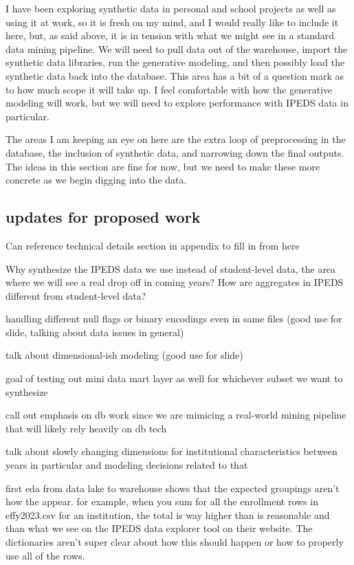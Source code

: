 \documentclass[sigconf, authorversion, nonacm]{acmart}
\begin{document}
    I have been exploring synthetic data in personal and school projects as well as using it at work, so it is fresh on my mind, and I would really like to include it here, but, as said above, it is in tension with what we might see in a standard data mining pipeline. We will need to pull data out of the warehouse, import the synthetic data libraries, run the generative modeling, and then possibly load the synthetic data back into the database. This area has a bit of a question mark as to how much scope it will take up. I feel comfortable with how the generative modeling will work, but we will need to explore performance with IPEDS data in particular.

    The areas I am keeping an eye on here are the extra loop of preprocessing in the database, the inclusion of synthetic data, and narrowing down the final outputs. The ideas in this section are fine for now, but we need to make these more concrete as we begin digging into the data.

    \subsection{updates for proposed work}

        Can reference technical details section in appendix to fill in from here

        Why synthesize the IPEDS data we use instead of student-level data, the area where we will see a real drop off in coming years? How are aggregates in IPEDS different from student-level data?

        handling different null flags or binary encodings even in same files (good use for slide, talking about data issues in general)

        talk about dimensional-ish modeling (good use for slide)

        goal of testing out mini data mart layer as well for whichever subset we want to synthesize

        call out emphasis on db work since we are mimicing a real-world mining pipeline that will likely rely heavily on db tech

        talk about slowly changing dimensions for institutional characteristics between years in particular and modeling decisions related to that

        first eda from data lake to warehouse shows that the expected groupings aren't how the appear. for example, when you sum for all the enrollment rows in effy2023.csv for an institution, the total is way higher than is reasonable and than what we see on the IPEDS data explorer tool on their website. The dictionaries aren't super clear about how this should happen or how to properly use all of the rows.
\end{document}
